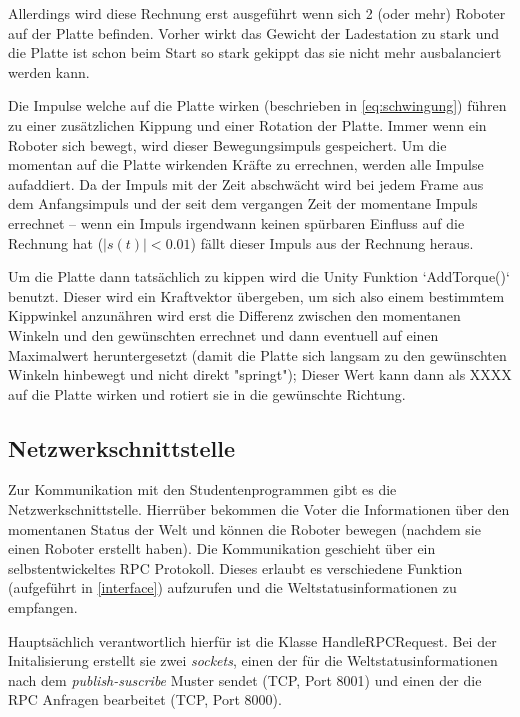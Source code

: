 Allerdings wird diese Rechnung erst ausgef{\"{u}}hrt wenn sich 2 (oder mehr) Roboter auf der Platte befinden. Vorher wirkt das Gewicht der Ladestation zu
stark und die Platte ist schon beim Start so stark gekippt das sie nicht mehr ausbalanciert werden kann.

Die Impulse welche auf die Platte wirken (beschrieben in \ref{eq:schwingung}) f{\"{u}}hren zu einer zus{\"{a}}tzlichen Kippung und einer Rotation der Platte.
Immer wenn ein Roboter sich bewegt, wird dieser Bewegungsimpuls gespeichert. Um die momentan auf die Platte wirkenden Kr{\"{a}}fte zu errechnen, werden alle
Impulse aufaddiert. Da der Impuls mit der Zeit abschw{\"{a}}cht wird bei jedem Frame aus dem Anfangsimpuls und der seit dem vergangen Zeit der momentane
Impuls errechnet -- wenn ein Impuls irgendwann keinen sp{\"{u}}rbaren Einfluss auf die Rechnung hat ($ |s(t)| < 0.01$) f{\"{a}}llt dieser Impuls aus der
Rechnung heraus.

Um die Platte dann tats{\"{a}}chlich zu kippen wird die Unity Funktion `AddTorque()` benutzt. Dieser wird ein Kraftvektor {\"{u}}bergeben, um sich also einem
bestimmtem Kippwinkel anzun{\"{a}}hren wird erst die Differenz zwischen den momentanen Winkeln und den gew{\"{u}}nschten errechnet und dann eventuell auf
einen Maximalwert heruntergesetzt (damit die Platte sich langsam zu den gew{\"{u}}nschten Winkeln hinbewegt und nicht direkt "springt"); Dieser Wert kann dann
als XXXX auf die Platte wirken und rotiert sie in die gew{\"{u}}nschte Richtung.

\subsection{Netzwerkschnittstelle}
Zur Kommunikation mit den Studentenprogrammen gibt es die Netzwerkschnittstelle. Hierr{\"{u}}ber bekommen die Voter die Informationen {\"{u}}ber den momentanen
Status der Welt und k{\"{o}}nnen die Roboter bewegen (nachdem sie einen Roboter erstellt haben). Die Kommunikation geschieht {\"{u}}ber ein selbstentwickeltes
RPC Protokoll. Dieses erlaubt es verschiedene Funktion (aufgef{\"{u}}hrt in \ref{interface}) aufzurufen und die Weltstatusinformationen zu empfangen.

Haupts{\"{a}}chlich verantwortlich hierf{\"{u}}r ist die Klasse HandleRPCRequest. Bei der Initalisierung erstellt sie zwei \textit{sockets}, einen der f{\"{u}}r
die Weltstatusinformationen nach dem \textit{publish-suscribe} Muster sendet (TCP, Port 8001) und einen der die RPC Anfragen bearbeitet (TCP, Port 8000).

